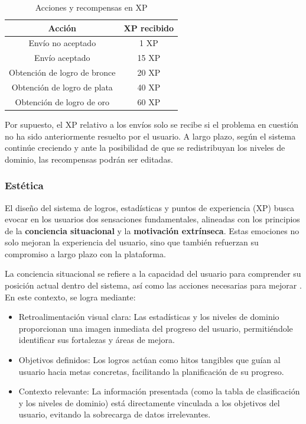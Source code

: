 \begin{table}[h]
\centering
\small
\begin{tabular}{cc}
\toprule
\textbf{Acción} & \textbf{XP recibido} \\
\midrule
Envío no aceptado            & 1 XP \\
\midrule
Envío aceptado               & 15 XP \\
\midrule
Obtención de logro de bronce & 20 XP \\
\midrule
Obtención de logro de plata  & 40 XP \\
\midrule
Obtención de logro de oro    & 60 XP \\
\bottomrule
\end{tabular}
\caption{Acciones y recompensas en XP}
\label{tab:sistema-puntos}
\end{table}

Por supuesto, el XP relativo a los envíos solo se recibe si el problema en cuestión no ha sido anteriormente resuelto por el usuario.
A largo plazo, según el sistema continúe creciendo y ante la posibilidad de que se redistribuyan los niveles de dominio, las recompensas podrán ser editadas.

\subsubsection{Estética}
El diseño del sistema de logros, estadísticas y puntos de experiencia (XP) busca evocar en los usuarios dos sensaciones fundamentales, alineadas con los principios de la \textbf{conciencia situacional} y la \textbf{motivación extrínseca}. Estas emociones no solo mejoran la experiencia del usuario, sino que también refuerzan su compromiso a largo plazo con la plataforma.

La conciencia situacional se refiere a la capacidad del usuario para comprender su posición actual dentro del sistema, así como las acciones necesarias para mejorar \citep{Endsley_Jones_2012}. En este contexto, se logra mediante:
\begin{itemize}
    \item Retroalimentación visual clara: Las estadísticas y los niveles de dominio proporcionan una imagen inmediata del progreso del usuario, permitiéndole identificar sus fortalezas y áreas de mejora.
    \item Objetivos definidos: Los logros actúan como hitos tangibles que guían al usuario hacia metas concretas, facilitando la planificación de su progreso.
    \item Contexto relevante: La información presentada (como la tabla de clasificación y los niveles de dominio) está directamente vinculada a los objetivos del usuario, evitando la sobrecarga de datos irrelevantes.
\end{itemize}

